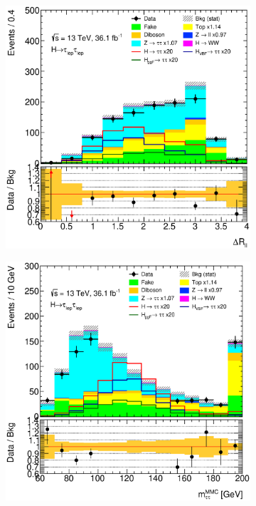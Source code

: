 \begin{figure}[htb]
    \centering
    \begin{subfigure}[t]{0.3\textwidth}
        \includegraphics[width=\textwidth]{./plots/mva/modeling/input_vars/VBF_DF/ll-CutMVAVBFCatDF-DeltaRLL-lin.eps}
    \end{subfigure}
    \begin{subfigure}[t]{0.3\textwidth}
        \includegraphics[width=\textwidth]{./plots/mva/modeling/input_vars/VBF_DF/ll-CutMVAVBFCatDF-dilep_mmc_mlm_m-lin.eps}

\end{subfigure}
\end{figure}
